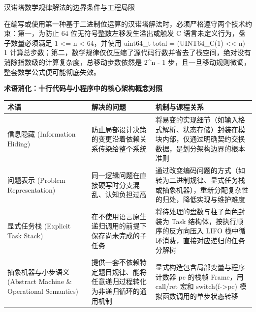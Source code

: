 \documentclass[UTF8,a4paper,11pt,fontset=fandol]{ctexart}
\begin{document}
\begin{warningbox}{汉诺塔数学规律解法的边界条件与工程局限}

在编写或使用第一种基于二进制位运算的汉诺塔解法时，必须严格遵守两个技术约束：第一，为防止 64 位无符号整数左移发生溢出或触发 C 语言未定义行为，盘子数量必须满足 1 <= n < 64，并使用 uint64\_t total = (UINT64\_C(1) << n) - 1 计算总步数；第二，数学规律仅仅压缩了源代码行数并省去了栈空间，绝对没有消除指数级的计算复杂度，总移动步数依然是 2\textasciicircum{}n - 1 步，且一旦移动规则微调，整套数学公式便可能彻底失效。

\end{warningbox}

\par{}\textbf{术语消化：十行代码与小程序中的核心架构概念对照}

\begin{center}\small\begin{tabularx}{\linewidth}{YYY}

\toprule

术语 & 解决的问题 & 机制与课程关系\\\midrule

信息隐藏 (Information Hiding) & 防止局部设计决策的变更沿着依赖关系传染给整个系统 & 将易变的实现细节（如输入格式解析、状态存储）封装在模块内部，仅通过明确契约交换数据，是划分架构边界的根本准则\\[3pt]

问题表示 (Problem Representation) & 同一逻辑问题在直接硬写时分支混乱、认知负担过高 & 通过改变编码问题的方式（如转为二进制规律、显式任务栈或抽象机器），重新分配复杂性的归处，降低实现与维护难度\\[3pt]

显式任务栈 (Explicit Task Stack) & 在不使用语言原生递归调用的前提下保存尚未完成的子任务 & 将待处理的盘数与柱子角色封装为 Task 结构体，按执行顺序的反方向压入 LIFO 栈中循环消费，直接对应递归的任务分解树\\[3pt]

抽象机器与小步语义 (Abstract Machine \& Operational Semantics) & 提供一套不依赖特定题目规律、能将任意递归过程转化为非递归循环的通用机制 & 显式构造包含局部变量与程序计数器 pc 的栈帧 Frame，用 call/ret 宏和 switch(f->pc) 模拟函数调用的单步状态转移\\[3pt]

\bottomrule\end{tabularx}\end{center}
\end{document}
